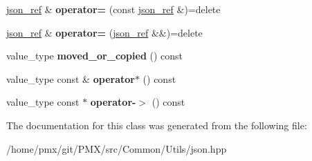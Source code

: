\begin{DoxyCompactItemize}
\hyperlink{classnlohmann_1_1detail_1_1json__ref}{json\+\_\+ref} \& {\bfseries operator=} (const \hyperlink{classnlohmann_1_1detail_1_1json__ref}{json\+\_\+ref} \&)=delete
\item 
\mbox{\label{classnlohmann_1_1detail_1_1json__ref_a9a73363d9be6b300ddd30745786c50a6}} 
\hyperlink{classnlohmann_1_1detail_1_1json__ref}{json\+\_\+ref} \& {\bfseries operator=} (\hyperlink{classnlohmann_1_1detail_1_1json__ref}{json\+\_\+ref} \&\&)=delete
\item 
\mbox{\label{classnlohmann_1_1detail_1_1json__ref_ae39e523218bf05cac3fb5b5b1cd5efb6}} 
value\+\_\+type {\bfseries moved\+\_\+or\+\_\+copied} () const
\item 
\mbox{\label{classnlohmann_1_1detail_1_1json__ref_aa3100e41472dba02ab78ccc1607e44ab}} 
value\+\_\+type const  \& {\bfseries operator$\ast$} () const
\item 
\mbox{\label{classnlohmann_1_1detail_1_1json__ref_adb652774a67829876449dc0b30637456}} 
value\+\_\+type const  $\ast$ {\bfseries operator-\/$>$} () const
\end{DoxyCompactItemize}


The documentation for this class was generated from the following file\+:\begin{DoxyCompactItemize}
\item 
/home/pmx/git/\+P\+M\+X/src/\+Common/\+Utils/json.\+hpp\end{DoxyCompactItemize}
